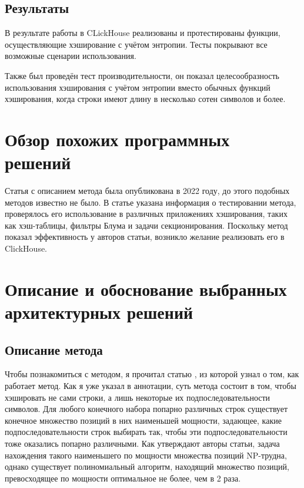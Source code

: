 \documentclass[a4paper,12pt]{extarticle}
\begin{document}
\begin{sloppypar}
\subsection{Результаты}

В результате работы в CLickHouse реализованы и протестированы функции, осуществляющие хэширование с учётом энтропии. Тесты покрывают все возможные сценарии использования.

Также был проведён тест производительности, он показал целесообразность использования хэширования с учётом энтропии вместо обычных функций хэширования, когда строки имеют длину в несколько сотен символов и более.

\pagebreak

\section{Обзор похожих программных решений}

Статья с описанием метода \cite{the_paper} была опубликована в 2022 году, до этого подобных методов известно не было. В статье указана информация о тестировании метода, проверялось его использование в различных приложениях хэширования, таких как хэш-таблицы, фильтры Блума и задачи секционирования. Поскольку метод показал эффективность у авторов статьи, возникло желание реализовать его в ClickHouse.

\newpage

\section{Описание и обоснование выбранных архитектурных решений}
\subsection{Описание метода}
Чтобы познакомиться с методом, я прочитал статью \cite{the_paper}, из которой узнал о том, как работает метод. Как я уже указал в аннотации, суть метода состоит в том, чтобы хэшировать не сами строки, а лишь некоторые их подпоследовательности символов. Для любого конечного набора попарно различных строк существует конечное множество позиций в них наименьшей мощности, задающее, какие подпоследовательности строк выбирать так, чтобы эти подпоследовательности тоже оказались попарно различными. Как утверждают авторы статьи, задача нахождения такого наименьшего по мощности множества позиций NP-трудна, однако существует полиномиальный алгоритм, находящий множество позиций, превосходящее по мощности оптимальное не более, чем в 2 раза.


\end{sloppypar}
\end{document}
